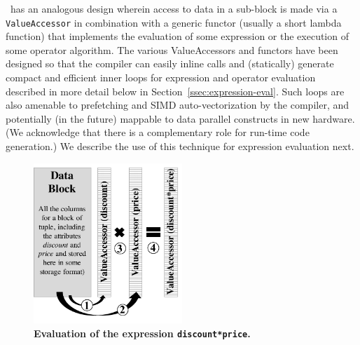 \Quickstep\ has an analogous design wherein access to data in a sub-block is made via a \texttt{ValueAccessor} in combination with a generic functor (usually a short lambda function) that implements the evaluation of some expression or the execution of some operator algorithm. The various ValueAccessors and functors have been designed so that the compiler can easily inline calls and (statically) generate compact and efficient inner loops for expression and operator evaluation described in more detail below in Section~\ref{ssec:expression-eval}. Such loops are also amenable to prefetching and SIMD auto-vectorization by the compiler, and potentially (in the future) mappable to data parallel constructs in new hardware. (We acknowledge that there is a complementary role for run-time code generation.) We describe the use of this technique for expression evaluation next.


\begin{figure}
\centering
   \includegraphics[width=0.5\textwidth]{system/figures/VA.pdf}
   \caption{\textbf{Evaluation of the expression \texttt{discount*price}.}}
   \label{fig-template-VA}
\end{figure}


